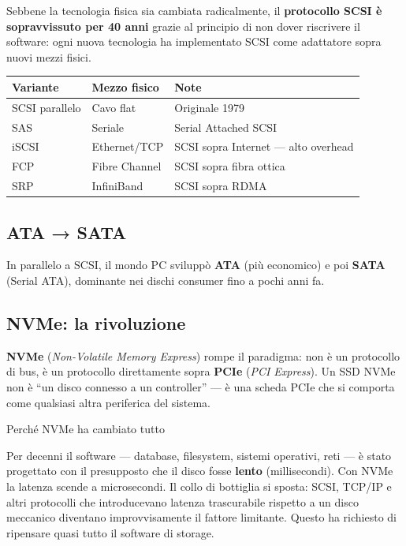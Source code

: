 \documentclass[
  italian,
  openany]{book}
\newcounter{none} %
\begin{document}
Sebbene la tecnologia fisica sia cambiata radicalmente, il
\textbf{protocollo SCSI è sopravvissuto per 40 anni} grazie al principio
di non dover riscrivere il software: ogni nuova tecnologia ha
implementato SCSI come adattatore sopra nuovi mezzi fisici.

{\def\LTcaptype{none} %
\begin{longtable}[]{@{}lll@{}}
\toprule\noalign{}
Variante & Mezzo fisico & Note \\
\midrule\noalign{}
\endhead
\bottomrule\noalign{}
\endlastfoot
SCSI parallelo & Cavo flat & Originale 1979 \\
SAS & Seriale & Serial Attached SCSI \\
iSCSI & Ethernet/TCP & SCSI sopra Internet --- alto overhead \\
FCP & Fibre Channel & SCSI sopra fibra ottica \\
SRP & InfiniBand & SCSI sopra RDMA \\
\end{longtable}
}

\subsection{ATA → SATA}\label{ata-sata}

In parallelo a SCSI, il mondo PC sviluppò \textbf{ATA} (più economico) e
poi \textbf{SATA} (Serial ATA), dominante nei dischi consumer fino a
pochi anni fa.

\subsection{NVMe: la rivoluzione}\label{nvme-la-rivoluzione}

\textbf{NVMe} (\emph{Non-Volatile Memory Express}) rompe il paradigma:
non è un protocollo di bus, è un protocollo direttamente sopra
\textbf{PCIe} (\emph{PCI Express}). Un SSD NVMe non è ``un disco
connesso a un controller'' --- è una scheda PCIe che si comporta come
qualsiasi altra periferica del sistema.

\begin{callouttip}{Perché NVMe ha cambiato tutto}

Per decenni il software --- database, filesystem, sistemi operativi,
reti --- è stato progettato con il presupposto che il disco fosse
\textbf{lento} (millisecondi). Con NVMe la latenza scende a
microsecondi. Il collo di bottiglia si sposta: SCSI, TCP/IP e altri
protocolli che introducevano latenza trascurabile rispetto a un disco
meccanico diventano improvvisamente il fattore limitante. Questo ha
richiesto di ripensare quasi tutto il software di storage.

\end{callouttip}
\end{document}
